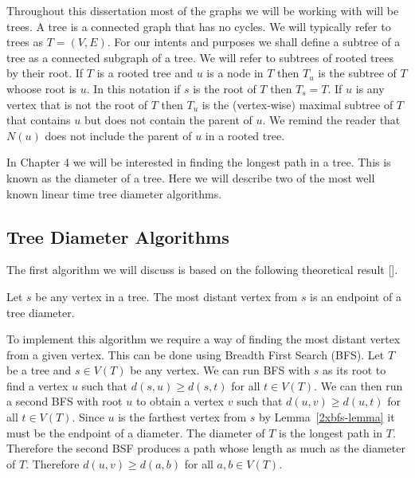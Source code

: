 Throughout this dissertation most of the graphs we will be working with will be trees. A tree is a connected graph that has no cycles. We will typically refer to trees as $T = (V, E)$. For our intents and purposes we shall define a subtree of a tree as a connected subgraph of a tree. We will refer to subtrees of rooted trees by their root. If $T$ is a rooted tree and $u$ is a node in $T$ then $T_u$ is the subtree of $T$ whoose root is $u$. In this notation if $s$ is the root of $T$ then $T_s = T$. If $u$ is any vertex that is not the root of $T$ then $T_u$ is the (vertex-wise) maximal subtree of $T$ that contains $u$ but does not contain the parent of $u$. We remind the reader that $N(u)$ does not include the parent of $u$ in a rooted tree.


In Chapter 4 we will be interested in finding the longest path in a tree. This is known as the diameter of a tree. Here we will  describe two of the most well known linear time tree diameter algorithms.

\subsection{Tree Diameter Algorithms}

The first algorithm we will discuss is based on the following theoretical result [].

\begin{lem} \label{2xbfs-lemma} Let $s$ be any vertex in a tree. The most distant vertex from $s$ is an endpoint of a tree diameter. \end{lem}

To implement this algorithm we require a way of finding the most distant vertex from a given vertex. This can be done using Breadth First Search (BFS). Let $T$ be a tree and $s \in V(T)$ be any vertex. We can run BFS with $s$ as its root to find a vertex $u$ such that $d(s, u) \ge d(s, t)$ for all $t \in V(T)$. We can then run a second BFS with root $u$ to obtain a vertex $v$ such that $d(u, v) \ge d(u, t)$ for all $t \in V(T)$. Since $u$ is the farthest vertex from $s$ by Lemma~\ref{2xbfs-lemma} it must be the endpoint of a diameter. The diameter of $T$ is the longest path in $T$. Therefore the second BSF produces a path whose length as much as the diameter of $T$. Therefore $d(u, v) \ge d(a, b)$ for all $a,b \in V(T)$.

